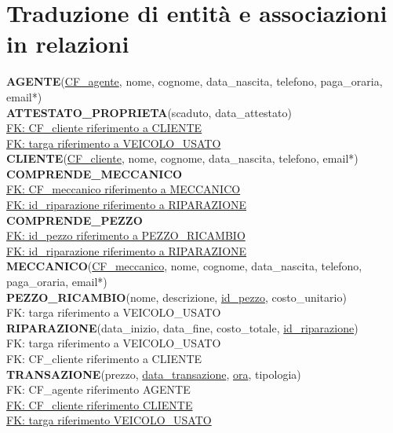 \documentclass[a4paper,12pt]{report}
\begin{document}
\section{Traduzione di entità e associazioni in relazioni}

\textbf{AGENTE}(\underline{CF\_agente}, nome, cognome, data\_nascita, telefono, paga\_oraria, email*)\\

\noindent
\textbf{ATTESTATO\_PROPRIETA}(scaduto, data\_attestato)\\
\underline{FK: CF\_cliente riferimento a CLIENTE}\\
\underline{FK: targa riferimento a VEICOLO\_USATO}\\

\noindent
\textbf{CLIENTE}(\underline{CF\_cliente}, nome, cognome, data\_nascita, telefono, email*)\\

\noindent
\textbf{COMPRENDE\_MECCANICO}\\
\underline{FK: CF\_meccanico riferimento a MECCANICO}\\
\underline{FK: id\_riparazione riferimento a RIPARAZIONE}\\

\noindent
\textbf{COMPRENDE\_PEZZO}\\
\underline{FK: id\_pezzo riferimento a PEZZO\_RICAMBIO}\\
\underline{FK: id\_riparazione riferimento a RIPARAZIONE}\\

\noindent
\textbf{MECCANICO}(\underline{CF\_meccanico}, nome, cognome, data\_nascita, telefono, paga\_oraria, email*)\\

\noindent
\textbf{PEZZO\_RICAMBIO}(nome, descrizione, \underline{id\_pezzo}, costo\_unitario)\\
FK: targa riferimento a VEICOLO\_USATO\\

\noindent
\textbf{RIPARAZIONE}(data\_inizio, data\_fine, costo\_totale, \underline{id\_riparazione})\\
FK: targa riferimento a VEICOLO\_USATO\\
FK: CF\_cliente riferimento a CLIENTE\\

\noindent
\textbf{TRANSAZIONE}(prezzo, \underline{data\_transazione}, \underline{ora}, tipologia)\\
FK: CF\_agente riferimento AGENTE\\
\underline{FK: CF\_cliente riferimento CLIENTE}\\
\underline{FK: targa riferimento VEICOLO\_USATO}\\
\end{document}
